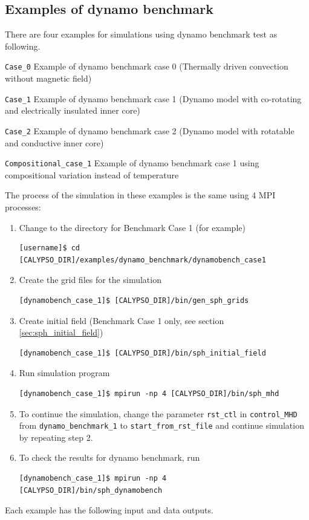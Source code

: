 \subsection{Examples of dynamo benchmark}
\label{section:dynamobench}
There are four examples for simulations using dynamo benchmark test as following.
%
\begin{description}
\item{\tt Case\_0} Example of dynamo benchmark case 0 (Thermally driven convection without magnetic field)
\item{\tt Case\_1} Example of dynamo benchmark case 1 (Dynamo model with co-rotating and electrically insulated inner core)
\item{\tt Case\_2} Example of dynamo benchmark case 2 (Dynamo model with rotatable and conductive inner core)
\item{\tt Compositional\_case\_1} Example of dynamo benchmark case 1 using compositional variation instead of temperature
\end{description}
%
The process of the simulation in these examples is the same using 4 MPI processes:
%
\begin{enumerate}
\item Change to the directory for Benchmark Case 1 (for example) \\
{\small
\begin{verbatim}
[username]$ cd [CALYPSO_DIR]/examples/dynamo_benchmark/dynamobench_case1
\end{verbatim}
}

\item  Create the grid files for the simulation  \\
{\small
\begin{verbatim}
[dynamobench_case_1]$ [CALYPSO_DIR]/bin/gen_sph_grids
\end{verbatim}
}

\item  Create initial field (Benchmark Case 1 only, see section \ref{sec:sph_initial_field}) \\
{\small
\begin{verbatim}
[dynamobench_case_1]$ [CALYPSO_DIR]/bin/sph_initial_field
\end{verbatim}
}

\item  Run simulation program
{\small
\begin{verbatim}
[dynamobench_case_1]$ mpirun -np 4 [CALYPSO_DIR]/bin/sph_mhd
\end{verbatim}
}

\item  To continue the simulation, change the parameter \verb|rst_ctl| in \verb|control_MHD| from \verb|dynamo_benchmark_1| to \verb|start_from_rst_file| and continue simulation by repeating step 2.

\item  To check the results for dynamo benchmark, run 
{\small
\begin{verbatim}
[dynamobench_case_1]$ mpirun -np 4 [CALYPSO_DIR]/bin/sph_dynamobench
\end{verbatim}
}
\end{enumerate}
Each example has the following input and data outputs.
%
